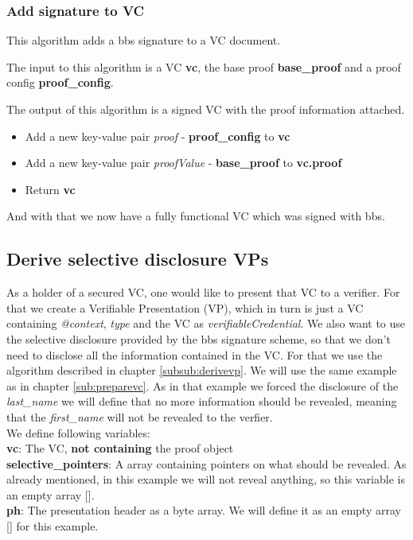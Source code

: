 \documentclass[
	a4paper               %
	,bibliography=totoc   %
	,listof=totoc         %
	,monolingual
	twoside=false,
]{bfhthesis}              %
\begin{document}
\subsubsection{Add signature to VC}
\label{subsubsec:signed}
This algorithm adds a bbs signature to a VC document.

The input to this algorithm is a VC \textbf{vc}, the base proof \textbf{base\_proof} and a proof config \textbf{proof\_config}.

The output of this algorithm is a signed VC with the proof information attached.

\begin{itemize}
	\item Add a new key-value pair \textit{proof} - \textbf{proof\_config} to \textbf{vc}
	\item Add a new key-value pair \textit{proofValue} - \textbf{base\_proof} to \textbf{vc.proof}
	\item Return \textbf{vc}
\end{itemize}

And with that we now have a fully functional VC which was signed with bbs.

\subsection{Derive selective disclosure VPs}
As a holder of a secured VC, one would like to present that VC to a verifier.
For that we create a Verifiable Presentation (VP), which in turn is just a VC containing \textit{@context}, \textit{type} and the VC as \textit{verifiableCredential}.
We also want to use the selective disclosure provided by the bbs signature scheme, so that we don't need to disclose all the information contained in the VC.
For that we use the algorithm described in chapter \ref{subsub:derivevp}.
We will use the same example as in chapter \ref{sub:preparevc}.
As in that example we forced the disclosure of the \textit{last\_name} we will define that no more information should be revealed, meaning that the \textit{first\_name} will not be revealed to the verfier.\\

We define following variables:\\
\textbf{vc}: The VC, \textbf{not containing} the proof object\\
\textbf{selective\_pointers}: A array containing pointers on what should be revealed. As already mentioned, in this example we will not reveal anything, so this variable is an empty array [].\\
\textbf{ph}: The presentation header as a byte array. We will define it as an empty array [] for this example.\\
\end{document}
